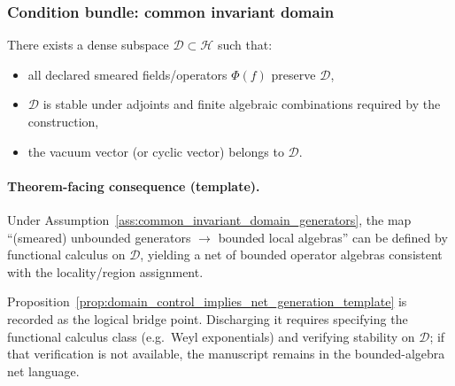 \subsubsection{Condition bundle: common invariant domain}
\begin{assumption}
\label{ass:common_invariant_domain_generators}
There exists a dense subspace $\mathcal{D}\subset\mathcal{H}$ such that:
\begin{itemize}
\item all declared smeared fields/operators $\Phi(f)$ preserve $\mathcal{D}$,
\item $\mathcal{D}$ is stable under adjoints and finite algebraic combinations required by the construction,
\item the vacuum vector (or cyclic vector) belongs to $\mathcal{D}$.
\end{itemize}
\end{assumption}

\paragraph{Theorem-facing consequence (template).}
\begin{proposition}
\label{prop:domain_control_implies_net_generation_template}
\MathTag Under Assumption~\ref{ass:common_invariant_domain_generators}, the map ``(smeared) unbounded generators $\rightarrow$ bounded local algebras'' can be defined by functional calculus on $\mathcal{D}$, yielding a net of bounded operator algebras consistent with the locality/region assignment.
\end{proposition}

\AuditTag Proposition~\ref{prop:domain_control_implies_net_generation_template} is recorded as the logical bridge point.
Discharging it requires specifying the functional calculus class (e.g.\ Weyl exponentials) and verifying stability on $\mathcal{D}$; if that verification is not available, the manuscript remains in the bounded-algebra net language.

